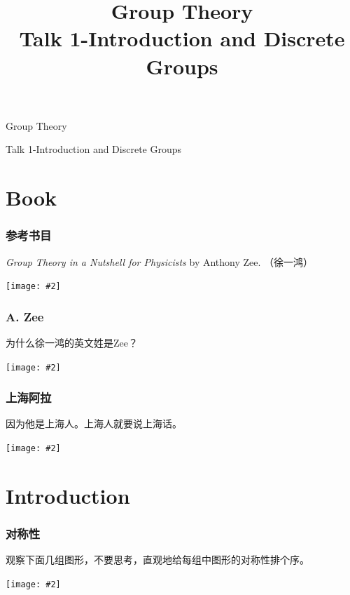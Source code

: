 \documentclass[CJK]{beamer}
\title{Group Theory\\ Talk 1-Introduction and Discrete Groups}
\author{}
\date{}
\newcommand{\cpic}[2]{
\begin{center}
\texttt{[image: \#2]}
\end{center}
}
\begin{document}
\begin{frame}
 
\begin{center}
\begin{Large}
\bch
Group Theory

{\vskip 0.3in}

Talk 1-Introduction and Discrete Groups

\ech
\end{Large}
\end{center}

\vskip 0.2in


\end{frame}

\section{Book}
\begin{frame}
\frametitle{\bch 参考书目 \ech}
\bch
\emph{Group Theory in a Nutshell for Physicists} by Anthony Zee. （徐一鸿）
\cpic{0.2}{book}
\ech
\end{frame}

\begin{frame}
\frametitle{\bch A. Zee \ech}
\bch
为什么徐一鸿的英文姓是Zee？
\cpic{0.3}{az.jpg}
\ech
\end{frame}

\begin{frame}
\frametitle{\bch 上海阿拉 \ech}
\bch
因为他是上海人。上海人就要说上海话。
\cpic{0.06}{zikawei}
\ech
\end{frame}

\section{Introduction}
\begin{frame}
\frametitle{\bch 对称性 \ech}
\bch
观察下面几组图形，不要思考，直观地给每组中图形的对称性排个序。
\cpic{0.2}{sym1}

\ech
\end{frame}
\end{document}
